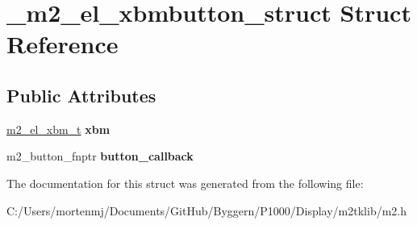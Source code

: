 \hypertarget{struct__m2__el__xbmbutton__struct}{\section{\-\_\-m2\-\_\-el\-\_\-xbmbutton\-\_\-struct Struct Reference}
\label{struct__m2__el__xbmbutton__struct}
}
\subsection*{Public Attributes}
\begin{DoxyCompactItemize}
\item 
\hypertarget{struct__m2__el__xbmbutton__struct_a34c9d84b6f139044de64c7babbea124b}{\hyperlink{struct__m2__el__xbm__struct}{m2\-\_\-el\-\_\-xbm\-\_\-t} {\bfseries xbm}}\label{struct__m2__el__xbmbutton__struct_a34c9d84b6f139044de64c7babbea124b}

\item 
\hypertarget{struct__m2__el__xbmbutton__struct_af3a3a90ea85cf39fa01d26071b4e8c5b}{m2\-\_\-button\-\_\-fnptr {\bfseries button\-\_\-callback}}\label{struct__m2__el__xbmbutton__struct_af3a3a90ea85cf39fa01d26071b4e8c5b}

\end{DoxyCompactItemize}


The documentation for this struct was generated from the following file\-:\begin{DoxyCompactItemize}
\item 
C\-:/\-Users/mortenmj/\-Documents/\-Git\-Hub/\-Byggern/\-P1000/\-Display/m2tklib/m2.\-h\end{DoxyCompactItemize}
